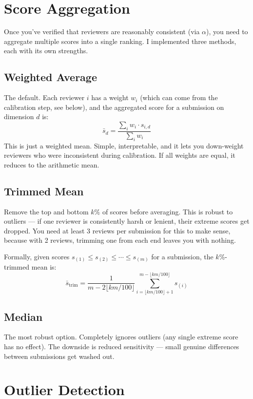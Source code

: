 \documentclass[11pt]{article}
\begin{document}
\section{Score Aggregation}

Once you've verified that reviewers are reasonably consistent (via $\alpha$), you need to aggregate multiple scores into a single ranking. I implemented three methods, each with its own strengths.

\subsection{Weighted Average}

The default. Each reviewer $i$ has a weight $w_i$ (which can come from the calibration step, see below), and the aggregated score for a submission on dimension $d$ is:
\[
    \bar{s}_d = \frac{\sum_{i} w_i \cdot s_{i,d}}{\sum_i w_i}
\]
This is just a weighted mean. Simple, interpretable, and it lets you down-weight reviewers who were inconsistent during calibration. If all weights are equal, it reduces to the arithmetic mean.

\subsection{Trimmed Mean}

Remove the top and bottom $k\%$ of scores before averaging. This is robust to outliers --- if one reviewer is consistently harsh or lenient, their extreme scores get dropped. You need at least 3 reviews per submission for this to make sense, because with 2 reviews, trimming one from each end leaves you with nothing.

Formally, given scores $s_{(1)} \leq s_{(2)} \leq \cdots \leq s_{(m)}$ for a submission, the $k\%$-trimmed mean is:
\[
    \bar{s}_{\text{trim}} = \frac{1}{m - 2\lfloor km/100 \rfloor} \sum_{i = \lfloor km/100 \rfloor + 1}^{m - \lfloor km/100 \rfloor} s_{(i)}
\]

\subsection{Median}

The most robust option. Completely ignores outliers (any single extreme score has no effect). The downside is reduced sensitivity --- small genuine differences between submissions get washed out.

\section{Outlier Detection}
\end{document}
